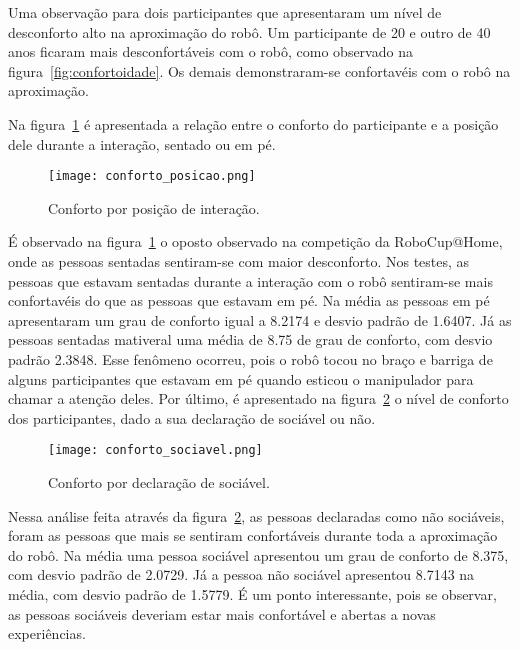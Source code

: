 Uma observação para dois participantes que apresentaram um nível de desconforto alto na aproximação do robô. Um participante de 20 e outro de 40 anos ficaram mais desconfortáveis com o robô, como observado na figura~\ref{fig:confortoidade}. Os demais demonstraram-se confortavéis com o robô na aproximação.

Na figura~\ref{fig:confortoposicao} é apresentada a relação entre o conforto do participante e a posição dele durante a interação, sentado ou em pé.

\begin{figure}[ht!]
	\centering
	\begin{minipage}{0.65\textwidth}
		\caption{Conforto por posição de interação.}
		\texttt{[image: conforto\_posicao.png]}
		\label{fig:confortoposicao}
	\end{minipage}
\end{figure}

É observado na figura~\ref{fig:confortoposicao} o oposto observado na competição da RoboCup@Home, onde as pessoas sentadas sentiram-se com maior desconforto. Nos testes, as pessoas que estavam sentadas durante a interação com o robô sentiram-se mais confortavéis do que as pessoas que estavam em pé. Na média as pessoas em pé apresentaram um grau de conforto igual a 8.2174 e desvio padrão de 1.6407. Já as pessoas sentadas mativeral uma média de 8.75 de grau de conforto, com desvio padrão 2.3848. Esse fenômeno ocorreu, pois o robô tocou no braço e barriga de alguns participantes que estavam em pé quando esticou o manipulador para chamar a atenção deles. Por último, é apresentado na figura~\ref{fig:confortosociavel} o nível de conforto dos participantes, dado a sua declaração de sociável ou não.

\begin{figure}[ht!]
	\centering
	\begin{minipage}{0.65\textwidth}
		\caption{Conforto por declaração de sociável.}
		\texttt{[image: conforto\_sociavel.png]}
		\label{fig:confortosociavel}
	\end{minipage}
\end{figure}

Nessa análise feita através da figura~\ref{fig:confortosociavel}, as pessoas declaradas como não sociáveis, foram as pessoas que mais se sentiram confortáveis durante toda a aproximação do robô. Na média uma pessoa sociável apresentou um grau de conforto de 8.375, com desvio padrão de 2.0729. Já a pessoa não sociável apresentou 8.7143 na média, com desvio padrão de 1.5779. É um ponto interessante, pois se observar, as pessoas sociáveis deveriam estar mais confortável e abertas a novas experiências.

